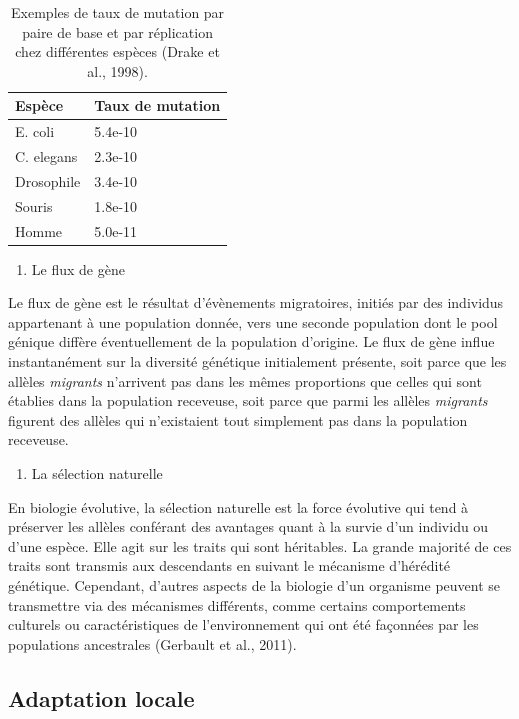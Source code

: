 \documentclass[12pt,a4paper,twoside]{ugathesis}
\providecommand{\tightlist}{%
  \setlength{\itemsep}{0pt}\setlength{\parskip}{0pt}}
\theoremstyle{definition}
\theoremstyle{definition}
\theoremstyle{remark}
\begin{document}
\begin{longtable}[t]{p{}p{}}
\caption{\label{tab:mutationRate}Exemples de taux de mutation par paire de base et
par réplication chez différentes espèces (Drake et al., 1998).}\\
\toprule
Espèce & Taux de mutation\\
\midrule
E. coli & 5.4e-10\\
C. elegans & 2.3e-10\\
Drosophile & 3.4e-10\\
Souris & 1.8e-10\\
Homme & 5.0e-11\\
\bottomrule
\end{longtable}
\begin{enumerate}
\def\labelenumi{\arabic{enumi}.}
\setcounter{enumi}{2}
\tightlist
\item
  Le flux de gène
\end{enumerate}
Le flux de gène est le résultat d'évènements migratoires, initiés par
des individus appartenant à une population donnée, vers une seconde
population dont le pool génique diffère éventuellement de la population
d'origine. Le flux de gène influe instantanément sur la diversité
génétique initialement présente, soit parce que les allèles
\emph{migrants} n'arrivent pas dans les mêmes proportions que celles qui
sont établies dans la population receveuse, soit parce que parmi les
allèles \emph{migrants} figurent des allèles qui n'existaient tout
simplement pas dans la population receveuse.
\begin{enumerate}
\def\labelenumi{\arabic{enumi}.}
\setcounter{enumi}{3}
\tightlist
\item
  La sélection naturelle
\end{enumerate}
En biologie évolutive, la sélection naturelle est la force évolutive qui
tend à préserver les allèles conférant des avantages quant à la survie
d'un individu ou d'une espèce. Elle agit sur les traits qui sont
héritables. La grande majorité de ces traits sont transmis aux
descendants en suivant le mécanisme d'hérédité génétique. Cependant,
d'autres aspects de la biologie d'un organisme peuvent se transmettre
via des mécanismes différents, comme certains comportements culturels ou
caractéristiques de l'environnement qui ont été façonnées par les
populations ancestrales (Gerbault et al., 2011).

\subsection{Adaptation locale}\label{adaptation-locale}
\end{document}
